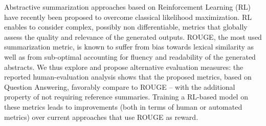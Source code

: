 Abstractive summarization approaches based on Reinforcement Learning (RL)  have recently been proposed to overcome classical likelihood maximization. RL enables to consider complex, possibly non differentiable, metrics that globally assess the quality and relevance of the generated outputs.
ROUGE, the most used summarization metric, is known to suffer from bias towards lexical similarity as well as from sub-optimal accounting for fluency and readability of the generated abstracts.
  We thus explore and propose alternative evaluation measures: the reported human-evaluation analysis shows that the proposed metrics, based on Question Answering, favorably compare to ROUGE -- with the additional property of not requiring reference summaries.
  Training a RL-based model on these metrics leads to improvements (both in terms of human or automated metrics) over current approaches that use ROUGE as reward.
